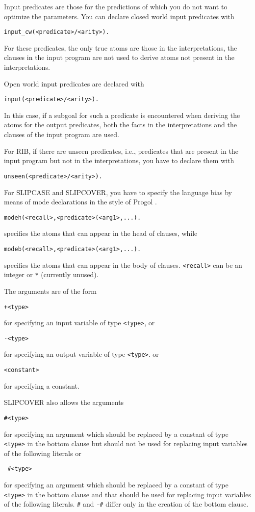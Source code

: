 \documentclass[a4paper,10pt]{article}
\newcommand{\href}[2]{\Link[#1]{}{} #2 \EndLink}
\begin{document}
Input predicates are those for the predictions of which you do not want to optimize the parameters. You can declare closed world input predicates with
\begin{verbatim}
input_cw(<predicate>/<arity>).
\end{verbatim}
For these predicates, the only true atoms are those in the interpretations, the clauses in the input program are not used to derive atoms not present in the interpretations.

Open world input predicates are declared with
\begin{verbatim}
input(<predicate>/<arity>).
\end{verbatim}
In this case, if a subgoal for such a predicate is encountered when deriving the atoms for the output predicates, 
both the facts in the interpretations and the clauses of the input program are used.

For RIB, if there are unseen predicates, i.e., predicates that are present in the input program but not in the interpretations, you have to declare them with
\begin{verbatim}
unseen(<predicate>/<arity>).
\end{verbatim}

For SLIPCASE and SLIPCOVER, you have to specify the language bias by means of mode declarations in the style of 
\href{http://www.doc.ic.ac.uk/\string ~shm/progol.html}{Progol}.
\begin{verbatim}
modeh(<recall>,<predicate>(<arg1>,...).
\end{verbatim}
specifies the atoms that can appear in the head of clauses, while
\begin{verbatim}
modeb(<recall>,<predicate>(<arg1>,...).
\end{verbatim}
specifies the atoms that can appear in the body of clauses.
\texttt{<recall>} can be an integer or \texttt{*} (currently unused).

The arguments are of the form
\begin{verbatim}
+<type>
\end{verbatim}
for specifying an input variable of type \texttt{<type>}, or 
\begin{verbatim}
-<type>
\end{verbatim}
for specifying an output variable of type \texttt{<type>}. or
\begin{verbatim}
<constant>
\end{verbatim}
for specifying a constant.

SLIPCOVER also allows the arguments
\begin{verbatim}
#<type>
\end{verbatim}
for specifying an argument which should be replaced by a constant of type \texttt{<type>} in the bottom clause but should not be used for replacing input variables of the following literals or 
\begin{verbatim}
-#<type>
\end{verbatim}
for specifying an argument which should be replaced by a constant of type \texttt{<type>} in the bottom clause and that should be used for replacing input variables of the following literals. \verb|#| and \verb|-#| differ only in the creation of the bottom clause.
\end{document}
